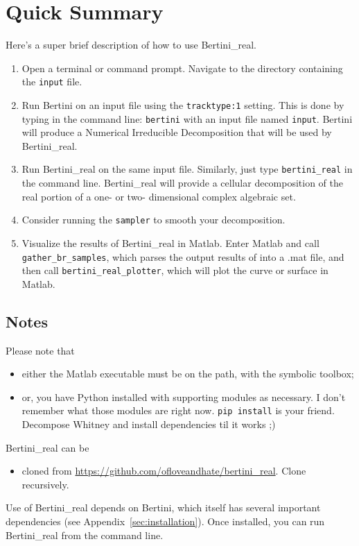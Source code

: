 \section{Quick Summary}
\label{sec:started}

Here's a super brief description of how to use Bertini\_real.


\begin{enumerate}
\item Open a terminal or command prompt. Navigate to the directory containing the {\tt input} file.
\item Run Bertini on an input file using the \texttt{tracktype:1} setting. This is done by typing in the command line: \texttt{bertini} with an input file named \texttt{input}. Bertini will produce a Numerical Irreducible Decomposition that will be used by Bertini\_real.
\item Run Bertini\_real on the same input file. Similarly, just type \texttt{bertini\_real} in the command line. Bertini\_real will provide a cellular decomposition of the real portion of a one- or two- dimensional complex algebraic set.
\item Consider running the {\tt sampler} to smooth your decomposition.
\item Visualize the results of Bertini\_real in Matlab. Enter Matlab and call \texttt{gather\_br\_samples}, which parses the output results of  into a .mat file, and then call \texttt{bertini\_real\_plotter}, which will plot the curve or surface in Matlab. 




\end{enumerate}

\subsection*{Notes}

 Please note that 
	\begin{itemize}
	\item either the Matlab executable must be on the path, with the symbolic toolbox;
	\item or, you have Python installed with supporting modules as necessary.  I don't remember what those modules are right now.  {\tt pip install} is your friend.  Decompose Whitney and install dependencies til it works ;)
	\end{itemize}

Bertini\_real can be 
\begin{itemize}
\item cloned from \url{https://github.com/ofloveandhate/bertini_real}.   Clone recursively.
\end{itemize}
Use of Bertini\_real depends on Bertini, which itself has several important dependencies (see Appendix~\ref{sec:installation}).
Once installed, you can run Bertini\_real from the command line. 


